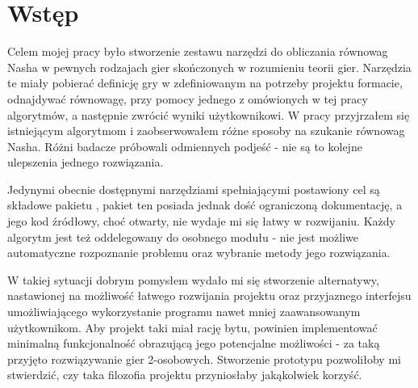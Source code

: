 \documentclass[polish]{standalone}
\begin{document}
\pagestyle{headings}

\section*{Wstęp}

Celem mojej pracy było stworzenie zestawu narzędzi do obliczania równowag Nasha w pewnych rodzajach gier skończonych
w rozumieniu teorii gier. Narzędzia te miały pobierać definicję gry w zdefiniowanym na potrzeby projektu formacie,
odnajdywać równowagę, przy pomocy jednego z omówionych w tej pracy algorytmów, a następnie zwrócić wyniki użytkownikowi.
W pracy przyjrzałem się istniejącym algorytmom i zaobserwowałem różne sposoby na szukanie równowag Nasha. Różni badacze
próbowali odmiennych podjeść - nie są to kolejne ulepszenia jednego rozwiązania.

Jedynymi obecnie dostępnymi narzędziami spełniającymi postawiony cel są składowe pakietu , pakiet ten
posiada jednak dość ograniczoną dokumentację, a jego kod źródłowy, choć otwarty, nie wydaje mi się łatwy w rozwijaniu.
Każdy algorytm jest też oddelegowany do osobnego modułu - nie jest możliwe automatyczne rozpoznanie problemu oraz wybranie metody jego rozwiązania.

W takiej sytuacji dobrym pomysłem wydało mi się stworzenie alternatywy, nastawionej na możliwość łatwego rozwijania
projektu oraz przyjaznego interfejsu umożliwiającego wykorzystanie programu nawet mniej zaawansowanym użytkownikom. Aby
projekt taki miał rację bytu, powinien implementować minimalną funkcjonalność obrazującą jego potencjalne możliwości
- za taką przyjęto rozwiązywanie gier 2-osobowych. Stworzenie prototypu pozwoliłoby mi stwierdzić, czy taka filozofia
projektu przyniosłaby jakąkolwiek korzyść.
\end{document}
